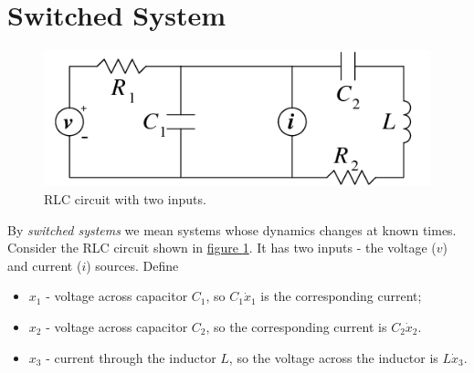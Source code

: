 \documentclass[letterpaper,10pt,english]{sphinxmanual}
\begin{document}
\section{Switched System}
\label{main_source:switched-system}\begin{figure}[htbp]
\centering
\capstart

\includegraphics{rlc.png}
\caption{RLC circuit with two inputs.}\label{main_source:rlcfig}\end{figure}

By \emph{switched systems} we mean systems whose dynamics changes at known
times. Consider the RLC circuit shown in \hyperref[main_source:rlcfig]{figure  \ref*{main_source:rlcfig}}. It has two
inputs - the voltage ($v$) and current ($i$) sources. Define
\begin{itemize}
\item {} 
$x_1$ - voltage across capacitor $C_1$, so
$C_1\dot{x}_1$ is the corresponding current;

\item {} 
$x_2$ - voltage across capacitor $C_2$, so the
corresponding current is $C_2\dot{x}_2$.

\item {} 
$x_3$ - current through the inductor $L$, so the voltage
across the inductor is $L\dot{x}_3$.

\end{itemize}
\end{document}
